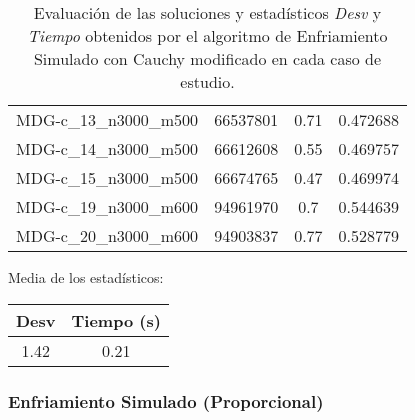 \documentclass{article}
\begin{document}
\begin{table}[H]
\begin{tabular}{|cccc|}
		MDG-c\_13\_n3000\_m500 & 66537801 & 0.71 & 0.472688\\
		MDG-c\_14\_n3000\_m500 & 66612608 & 0.55 & 0.469757\\
		MDG-c\_15\_n3000\_m500 & 66674765 & 0.47 & 0.469974\\
		MDG-c\_19\_n3000\_m600 & 94961970 & 0.7 & 0.544639\\
		MDG-c\_20\_n3000\_m600 & 94903837 & 0.77 & 0.528779\\
		\hline
	\end{tabular}
	\caption{Evaluación de las soluciones y estadísticos \emph{Desv} y \emph{Tiempo} obtenidos por el algoritmo de Enfriamiento Simulado con Cauchy modificado en cada caso de estudio.}
	\label{tab:es}
\end{table}

Media de los estadísticos:
\begin{table}[H]
	\centering
	\begin{tabular}{|cc|}
		\hline
		Desv & Tiempo (s)\\ \hline
		 1.42 & 0.21 \\
		\hline
	\end{tabular}
\end{table}

\pagebreak

\subsubsection*{Enfriamiento Simulado (Proporcional)}
\end{document}
